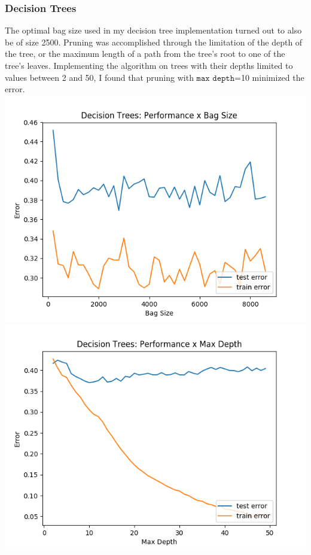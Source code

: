 \documentclass[11pt, a4paper]{article} %
\begin{document}
\subsubsection{Decision Trees}
The optimal bag size used in my decision tree implementation turned out to also be of size 2500. Pruning was accomplished through the limitation of the depth of the tree, or the maximum length of a path from the tree's root to one of the tree's leaves. Implementing the algorithm on trees with their depths limited to values between 2 and 50, I found that pruning with $\texttt{max depth}$=10 minimized the error. 
\newline\newline
\includegraphics[scale=0.525]{DTBS2.png}
\includegraphics[scale=0.525]{DTMD.png}
\end{document}
